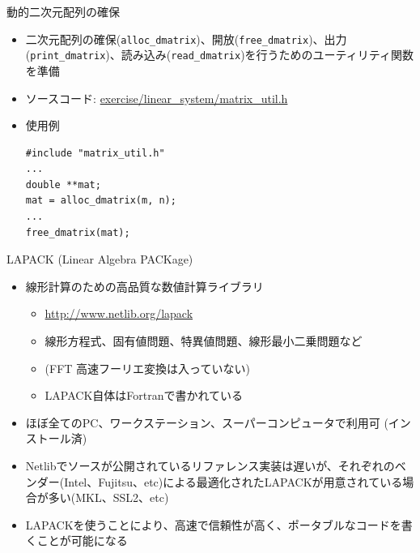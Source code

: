 \documentclass[dvipdfmx]{beamer}
\begin{document}
\begin{frame}[t,fragile]{動的二次元配列の確保}
  \begin{itemize}
    \setlength{\itemsep}{1em}
  \item 二次元配列の確保({\tt alloc\_dmatrix})、開放({\tt free\_dmatrix})、出力({\tt print\_dmatrix})、読み込み({\tt read\_dmatrix})を行うためのユーティリティ関数を準備
  \item ソースコード: \href{https://github.com/todo-group/computer-experiments/blob/master/exercise/linear_system/matrix_util.h}{exercise/linear\_system/matrix\_util.h}
  \item 使用例
\begin{lstlisting}
#include "matrix_util.h"
...
double **mat;
mat = alloc_dmatrix(m, n);
...
free_dmatrix(mat);
\end{lstlisting}
  \end{itemize}
\end{frame}

\begin{frame}[t,fragile]{LAPACK (Linear Algebra PACKage)}
  \begin{itemize}
  \item 線形計算のための高品質な数値計算ライブラリ
    \begin{itemize}
    \item \url{http://www.netlib.org/lapack}
    \item 線形方程式、固有値問題、特異値問題、線形最小二乗問題など
    \item (FFT 高速フーリエ変換は入っていない)
    \item LAPACK自体はFortranで書かれている
    \end{itemize}
  \item ほぼ全てのPC、ワークステーション、スーパーコンピュータで利用可 (インストール済)
  \item Netlibでソースが公開されているリファレンス実装は遅いが、それぞれのベンダー(Intel、Fujitsu、etc)による最適化されたLAPACKが用意されている場合が多い(MKL、SSL2、etc)
  \item LAPACKを使うことにより、高速で信頼性が高く、ポータブルなコードを書くことが可能になる
  \end{itemize}
\end{frame}
\end{document}
